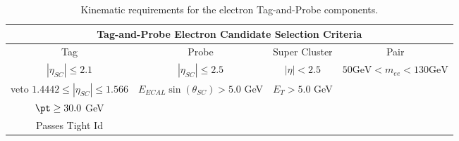\begin{table}
\caption{Kinematic requirements for the electron Tag-and-Probe components.}
\label{tab:eleTnPSelect}
\begin{adjustwidth}{-0.45in}{-1in}
\begin{tabular}{|c|c|c|c|}
\hline 
\multicolumn{4}{|c|}{Tag-and-Probe Electron Candidate Selection Criteria} \\ 
\hline 
Tag & Probe & Super Cluster & Pair \\ 
\hline 
$|\eta_{SC}| \leq 2.1$ & $|\eta_{SC}| \leq 2.5$  & $|\eta|<2.5 $ & $50 \text{GeV} < m_{ee} < 130 \text{GeV} $ \\
veto $ 1.4442 \leq |\eta_{SC}| \leq 1.566 $ & $E_{ECAL}\sin(\theta_{SC}) > 5.0 $ GeV & $E_T > 5.0 $ GeV &  \\
 $\pt \geq 30.0$ GeV &  &  &  \\
 Passes Tight Id &  &  & \\
\hline 
\end{tabular} 
\end{adjustwidth}
\end{table}





